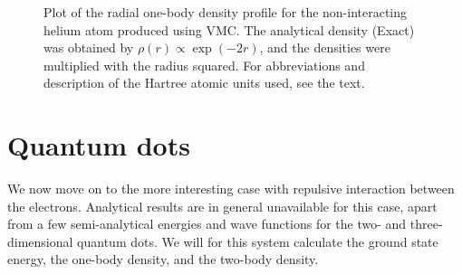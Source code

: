 \begin{figure}
	\centering
	\captionsetup[subfigure]{labelformat=empty}
	\caption{Plot of the radial one-body density profile for the non-interacting helium atom produced using VMC. The analytical density (Exact) was obtained by $\rho(r)\propto\exp(-2r)$, and the densities were multiplied with the radius squared. For  abbreviations and description of the Hartree atomic units used, see the text.}
	\label{fig:helium_nointeraction}
\end{figure}

\cleardoublepage
\section{Quantum dots} \label{sec:quantumdotresults}
We now move on to the more interesting case with repulsive interaction between the electrons. Analytical results are in general unavailable for this case, apart from a few semi-analytical energies and wave functions for the two- and three-dimensional quantum dots. We will for this system calculate the ground state energy, the one-body density, and the two-body density. 

